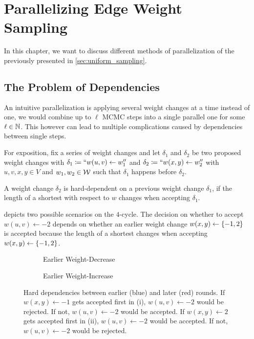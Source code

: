 \chapter{Parallelizing Edge Weight Sampling}\label{sec:parallel_sampling}
In this chapter, we want to discuss different methods of parallelization of the previously presented \markovs in \cref{sec:uniform_sampling}.

\section{The Problem of Dependencies}
An intuitive parallelization is applying several weight changes at a time instead of one, \ie we would combine up to $\ell$ MCMC steps into a single parallel one for some $\ell \in \mathbb N$.
This however can lead to multiple complications caused by dependencies between single steps.

For exposition, fix a series of weight changes and let $\delta_1$ and $\delta_2$ be two proposed weight changes with $\delta_1 \coloneqq ``w(u, v) \gets w_1''$ and $\delta_2 \coloneqq ``w(x, y) \gets w_2''$ with ${u, v, x, y \in V}$ and $w_1, w_2 \in \mathcal W$ such that $\delta_1$ happens before $\delta_2$.

\begin{definition}
    A weight change $\delta_2$ is hard-dependent on a previous weight change $\delta_1$, if the length of a shortest  with respect to $w$ changes when accepting $\delta_1$. 
\end{definition}

\noindent {} depicts two possible scenarios on the $4$-cycle.
The decision on whether to accept $w(u, v) \gets -2$ depends on whether an earlier weight change ${w(x, y) \gets \left\{-1, 2\right\}}$ is accepted because the length of a shortest  changes when accepting $w(x, y) \gets \left\{-1, 2\right\}$.

\begin{figure}[!htb]
    \centering
    \begin{subfigure}{0.45\textwidth}
        \centering
        
        \caption{Earlier Weight-Decrease}
    \end{subfigure}
    \hfill
    \begin{subfigure}{0.45\textwidth}
        \centering
        
        \caption{Earlier Weight-Increase}
    \end{subfigure}
    \caption{
        Hard dependencies between earlier (blue) and later (red) rounds.
        If ${w(x, y) \gets -1}$ gets accepted first in (i), ${w(u, v) \gets -2}$ would be rejected.
        If not, ${w(u, v) \gets -2}$ would be accepted.
        If ${w(x, y) \gets 2}$ gets accepted first in (ii), ${w(u, v) \gets -2}$ would be accepted.
        If not, ${w(u, v) \gets -2}$ would be rejected.
    }
    \label{fig:hard_dependency}
\end{figure}

